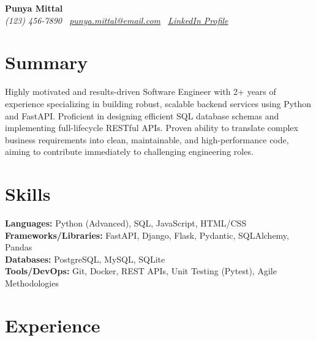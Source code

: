 \documentclass[10pt, letterpaper]{article}
\begin{document}
\begin{center}
    \Huge \textbf{Punya Mittal} \\
    \vspace{2pt}
    \em (123) 456-7890 \textperiodcentered\ \href{mailto:punya.mittal@email.com}{punya.mittal@email.com} \textperiodcentered\ \href{https://linkedin.com/in/punyamittal}{LinkedIn Profile}
\end{center}

\section*{Summary}
Highly motivated and results-driven Software Engineer with 2+ years of experience specializing in building robust, scalable backend services using Python and FastAPI. Proficient in designing efficient SQL database schemas and implementing full-lifecycle RESTful APIs. Proven ability to translate complex business requirements into clean, maintainable, and high-performance code, aiming to contribute immediately to challenging engineering roles.

\section*{Skills}
\textbf{Languages:} Python (Advanced), SQL, JavaScript, HTML/CSS \\
\textbf{Frameworks/Libraries:} FastAPI, Django, Flask, Pydantic, SQLAlchemy, Pandas \\
\textbf{Databases:} PostgreSQL, MySQL, SQLite \\
\textbf{Tools/DevOps:} Git, Docker, REST APIs, Unit Testing (Pytest), Agile Methodologies

\section*{Experience}
\end{document}
